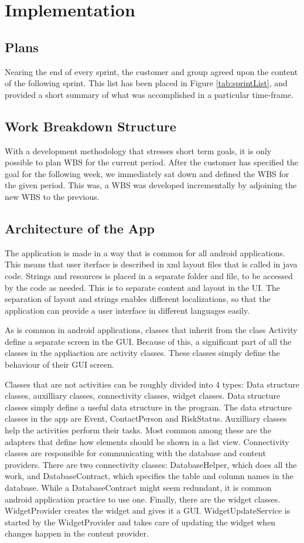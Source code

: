 \chapter{Implementation}
\section{Plans}

Nearing the end of every sprint, the customer and group agreed upon the content of the following sprint. This list has been placed in Figure \ref{tab:sprintList}, and provided a short summary of what was accomplished in a particular time-frame. 

\section{Work Breakdown Structure}
With a development methodology that stresses short term goals, it is only possible to plan WBS for the current period. After the customer has specified the goal for the following week, we immediately sat down and defined the WBS for the given period. This was, a WBS was developed incrementally by adjoining the new WBS to the previous.

\section{Architecture of the App}
The application is made in a way that is common for all android applications. This means that user iterface is described in xml layout files that is called in java code. Strings and resources is placed in a separate folder and file, to be accessed by the code as needed. This is to separate content and layout in the UI. The separation of layout and strings enables different localizations, so that the application can provide a user interface in different languages easily.

As is common in android applications, classes that inherit from the class Activity define a separate screen in the GUI. Because of this, a significant part of all the classes in the appliaction are activity classes. These classes simply define the behaviour of their GUI screen.

Classes that are not activities can be roughly divided into 4 types: Data structure classes, auxilliary classes, connectivity classes, widget classes. Data structure classes simply define a useful data structure in the program. The data structure classes in the app are Event, ContactPerson and RiskStatus. Auxilliary classes help the activities perform their tasks. Most common among these are the adapters that define how elements should be shown in a list view. Connectivity classes are responsible for communicating with the database and content providers. There are two connectivity classes: DatabaseHelper, which does all the work, and DatabaseContract, which specifies the table and column names in the database. While a DatabaseContract might seem redundant, it is common android application practice to use one. Finally, there are the widget classes. WidgetProvider creates the widget and gives it a GUI. WidgetUpdateService is started by the WidgetProvider and takes care of updating the widget when changes happen in the content provider.

